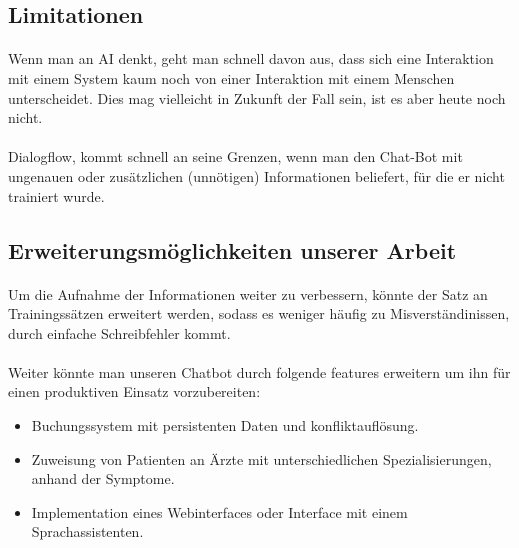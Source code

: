 \documentclass[11pt,a4paper]{article}
\begin{document}
    \subsection{Limitationen}
        \paragraph{}
            Wenn man an AI denkt, geht man schnell davon aus, dass sich eine Interaktion mit einem System kaum noch von einer Interaktion mit einem
            Menschen unterscheidet. Dies mag vielleicht in Zukunft der Fall sein, ist es aber heute noch nicht. 
        \paragraph{}
            Dialogflow, kommt schnell an seine Grenzen, wenn man den Chat-Bot mit ungenauen oder zusätzlichen (unnötigen) Informationen beliefert,
            für die er nicht trainiert wurde. 
    \subsection{Erweiterungsmöglichkeiten unserer Arbeit}
        \paragraph{}
            Um die Aufnahme der Informationen weiter zu verbessern, könnte der Satz an Trainingssätzen erweitert werden, sodass es weniger häufig
            zu Misverständinissen, durch einfache Schreibfehler kommt.
        \paragraph{}
            Weiter könnte man unseren Chatbot durch folgende features erweitern um ihn für einen produktiven Einsatz vorzubereiten:
            \begin{itemize}
                \item Buchungssystem mit persistenten Daten und konfliktauflösung.
                \item Zuweisung von Patienten an Ärzte mit unterschiedlichen Spezialisierungen, anhand der Symptome.
                \item Implementation eines Webinterfaces oder Interface mit einem Sprachassistenten. 
            \end{itemize}
\end{document}
